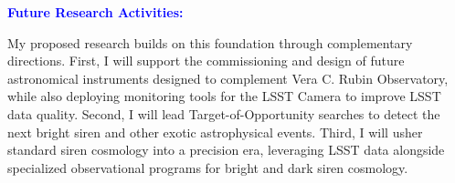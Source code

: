 \documentclass[11pt]{article}
\newcommand{\tcolor}{black}
\newcommand{\statement}[1]{\par\medskip
  \textcolor{blue}{\textbf{#1:}}%
}
\newcommand{\LSST}{\ac{lsst}}
\newcommand{\Rubin}{\ac{rubin}}
\newcommand{\Institute}{\textcolor{\tcolor}{ the Center for Astrophysics}}
\begin{document}

\statement{Future Research Activities}
My proposed research builds on this foundation through complementary directions. 
First, 
I will support the commissioning and design of future astronomical instruments designed to complement Vera C. Rubin Observatory, 
while also deploying monitoring tools for the LSST Camera to improve LSST data quality. 
Second, I will lead Target-of-Opportunity searches to detect the next bright siren and other exotic astrophysical events. 
Third, I will usher standard siren cosmology into a precision era, leveraging LSST data alongside specialized observational programs for bright and dark siren cosmology. %

\end{document}
